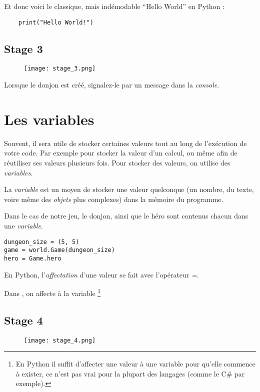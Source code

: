 Et donc voici le classique, mais indémodable “Hello World” en Python :

\begin{lstlisting}
    print("Hello World!")
\end{lstlisting}


\subsection{Stage 3}
\begin{figure}[ht]
\texttt{[image: stage\_3.png]} 
\end{figure}

Lorsque le donjon est créé, signalez-le par un message dans la \emph{console}.

\section{Les variables}

Souvent, il sera utile de stocker certaines valeurs tout au long de l’exécution de votre code.
Par exemple pour stocker la valeur d’un calcul, ou même afin de réutiliser ses valeurs plusieurs fois. Pour stocker des valeurs, on utilise des \emph{variables}.

La \emph{variable} est un moyen de stocker une valeur quelconque (un nombre, du texte, voire même des \emph{objets} plus complexes) dans la mémoire du programme.

Dans le cas de notre jeu, le donjon, ainsi que le héro sont contenus chacun dans une \emph{variable}.

\begin{lstlisting}
dungeon_size = (5, 5)
game = world.Game(dungeon_size)
hero = Game.hero
\end{lstlisting}

En Python, l’\emph{affectation} d’une valeur se fait avec l’opérateur \emph{=}.

Dans , on affecte  à la variable \footnote{ En Python il suffit d’affecter une valeur à une variable pour qu’elle commence à exister, ce n’est pas vrai pour la plupart des langages (comme le C\# par exemple).}

\subsection{Stage 4}
\begin{figure}[ht]
\texttt{[image: stage\_4.png]} 
\end{figure}

